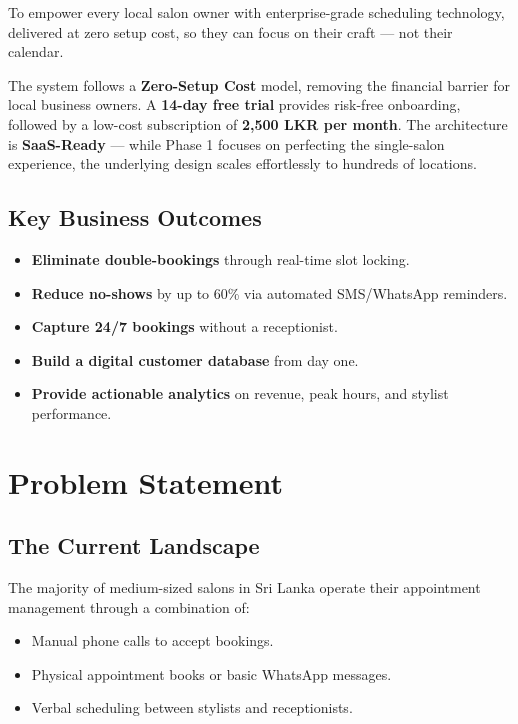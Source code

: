 \documentclass[12pt,a4paper]{report}
\begin{document}
\begin{infobox}
To empower every local salon owner with enterprise-grade scheduling technology,
delivered at zero setup cost, so they can focus on their craft — not their calendar.
\end{infobox}

The system follows a \textbf{Zero-Setup Cost} model, removing the financial barrier
for local business owners. A \textbf{14-day free trial} provides risk-free onboarding,
followed by a low-cost subscription of \textbf{2,500 LKR per month}. The architecture
is \textbf{SaaS-Ready} — while Phase 1 focuses on perfecting the single-salon
experience, the underlying design scales effortlessly to hundreds of locations.

\section{Key Business Outcomes}

\begin{itemize}[leftmargin=2em]
  \item \textbf{Eliminate double-bookings} through real-time slot locking.
  \item \textbf{Reduce no-shows} by up to 60\% via automated SMS/WhatsApp reminders.
  \item \textbf{Capture 24/7 bookings} without a receptionist.
  \item \textbf{Build a digital customer database} from day one.
  \item \textbf{Provide actionable analytics} on revenue, peak hours, and stylist performance.
\end{itemize}

\chapter{Problem Statement}

\section{The Current Landscape}

The majority of medium-sized salons in Sri Lanka operate their appointment management
through a combination of:

\begin{itemize}[leftmargin=2em]
  \item Manual phone calls to accept bookings.
  \item Physical appointment books or basic WhatsApp messages.
  \item Verbal scheduling between stylists and receptionists.
\end{itemize}
\end{document}

